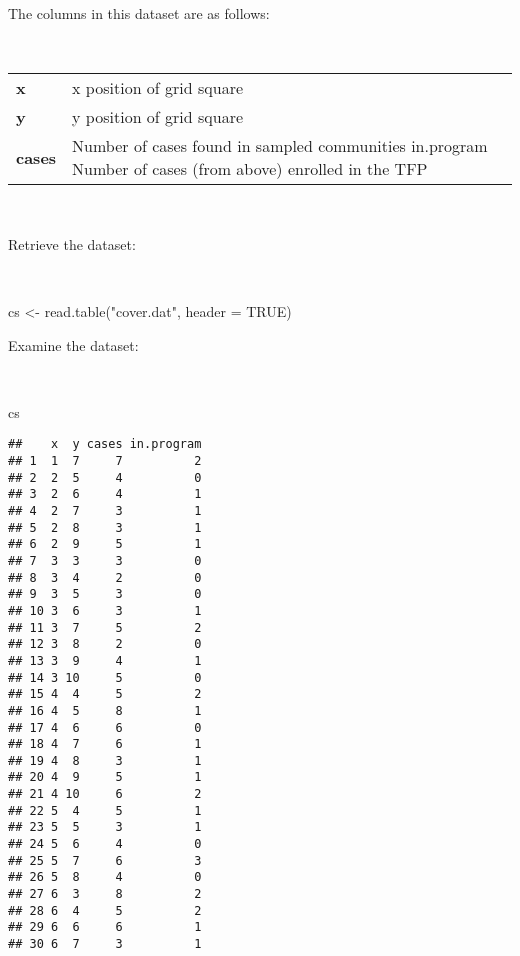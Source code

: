 \documentclass[
  12pt,
  a4paper]{book}
\newenvironment{Shaded}{\begin{snugshade}}{\end{snugshade}}
\newcommand{\AttributeTok}[1]{\textcolor[rgb]{0.77,0.63,0.00}{#1}}
\newcommand{\ConstantTok}[1]{\textcolor[rgb]{0.00,0.00,0.00}{#1}}
\newcommand{\FunctionTok}[1]{\textcolor[rgb]{0.00,0.00,0.00}{#1}}
\newcommand{\NormalTok}[1]{#1}
\newcommand{\OtherTok}[1]{\textcolor[rgb]{0.56,0.35,0.01}{#1}}
\newcommand{\StringTok}[1]{\textcolor[rgb]{0.31,0.60,0.02}{#1}}
\begin{document}
The columns in this dataset are as follows:

~

\begin{longtable}[]{@{}
  >{\raggedright\arraybackslash}p{}
  >{\raggedright\arraybackslash}p{}@{}}
\toprule
\endhead
\textbf{x} & x position of grid square \\
\textbf{y} & y position of grid square \\
\textbf{cases} & Number of cases found in sampled communities in.program Number of cases (from above) enrolled in the TFP \\
\bottomrule
\end{longtable}

~

Retrieve the dataset:

~

\begin{Shaded}
\begin{Highlighting}[]
\NormalTok{cs }\OtherTok{\textless{}{-}} \FunctionTok{read.table}\NormalTok{(}\StringTok{"cover.dat"}\NormalTok{, }\AttributeTok{header =} \ConstantTok{TRUE}\NormalTok{)}
\end{Highlighting}
\end{Shaded}

\newpage

Examine the dataset:

~

\begin{Shaded}
\begin{Highlighting}[]
\NormalTok{cs}
\end{Highlighting}
\end{Shaded}

\begin{verbatim}
##    x  y cases in.program
## 1  1  7     7          2
## 2  2  5     4          0
## 3  2  6     4          1
## 4  2  7     3          1
## 5  2  8     3          1
## 6  2  9     5          1
## 7  3  3     3          0
## 8  3  4     2          0
## 9  3  5     3          0
## 10 3  6     3          1
## 11 3  7     5          2
## 12 3  8     2          0
## 13 3  9     4          1
## 14 3 10     5          0
## 15 4  4     5          2
## 16 4  5     8          1
## 17 4  6     6          0
## 18 4  7     6          1
## 19 4  8     3          1
## 20 4  9     5          1
## 21 4 10     6          2
## 22 5  4     5          1
## 23 5  5     3          1
## 24 5  6     4          0
## 25 5  7     6          3
## 26 5  8     4          0
## 27 6  3     8          2
## 28 6  4     5          2
## 29 6  6     6          1
## 30 6  7     3          1
\end{verbatim}
\end{document}
